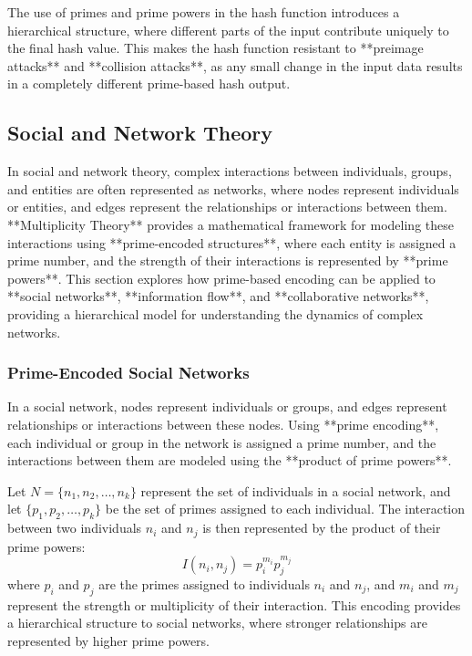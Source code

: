\documentclass[12pt]{article}
\begin{document}
The use of primes and prime powers in the hash function introduces a hierarchical structure, where different parts of the input contribute uniquely to the final hash value. This makes the hash function resistant to **preimage attacks** and **collision attacks**, as any small change in the input data results in a completely different prime-based hash output.


\subsection{Social and Network Theory}

In social and network theory, complex interactions between individuals, groups, and entities are often represented as networks, where nodes represent individuals or entities, and edges represent the relationships or interactions between them. **Multiplicity Theory** provides a mathematical framework for modeling these interactions using **prime-encoded structures**, where each entity is assigned a prime number, and the strength of their interactions is represented by **prime powers**. This section explores how prime-based encoding can be applied to **social networks**, **information flow**, and **collaborative networks**, providing a hierarchical model for understanding the dynamics of complex networks.

\subsubsection{Prime-Encoded Social Networks}

In a social network, nodes represent individuals or groups, and edges represent relationships or interactions between these nodes. Using **prime encoding**, each individual or group in the network is assigned a prime number, and the interactions between them are modeled using the **product of prime powers**.

Let \( N = \{n_1, n_2, \dots, n_k\} \) represent the set of individuals in a social network, and let \( \{p_1, p_2, \dots, p_k\} \) be the set of primes assigned to each individual. The interaction between two individuals \( n_i \) and \( n_j \) is then represented by the product of their prime powers:
\[
I(n_i, n_j) = p_i^{m_i} p_j^{m_j}
\]
where \( p_i \) and \( p_j \) are the primes assigned to individuals \( n_i \) and \( n_j \), and \( m_i \) and \( m_j \) represent the strength or multiplicity of their interaction. This encoding provides a hierarchical structure to social networks, where stronger relationships are represented by higher prime powers.
\end{document}
